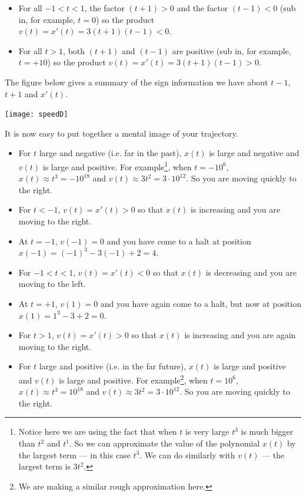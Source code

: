 \begin{eg}
\begin{itemize}
\item For all $-1<t<1$, the factor $(t+1)>0$ and the factor $(t-1)<0$
(sub in, for example, $t=0$) so the product $v(t)=x'(t)=3(t+1)(t-1)<0$.

\item For all $t>1$, both $(t+1)$ and $(t-1)$ are positive (sub in, for example,
$t=+10$) so the product $v(t)=x'(t)=3(t+1)(t-1)>0$.
\end{itemize}
The figure below gives a summary of the sign information we have about
$t-1$, $t+1$ and $x'(t)$.
\begin{efig}
\begin{center}
   \texttt{[image: speedD]}
\end{center}
\end{efig}
It is now easy to put together a mental image of your trajectory.
\begin{itemize}
\item For $t$ large and negative (i.e. far in the past), $x(t)$ is large
and negative and $v(t)$ is large and positive. For example\footnote{Notice here we are
using the fact that when $t$ is very large $t^3$ is much bigger than $t^2$ and $t^1$.
So we can approximate the value of the polynomial $x(t)$ by the largest term --- in
this case $t^3$. We can do similarly with $v(t)$ --- the largest term is $3t^2$.}, when
$t=-10^6$, $x(t)\approx t^3=- 10^{18}$ and $v(t)\approx  3t^2 = 3\cdot 10^{12}$.
So you are moving quickly to the right.

\item For $t<-1$, $v(t)=x'(t)>0$ so that $x(t)$ is increasing and you are moving
to the right.

\item At $t=-1$, $v(-1)=0$ and you have come to a halt at
position $x(-1)=(-1)^3-3(-1)+2=4$.

\item For $-1<t<1$, $v(t)=x'(t)<0$ so that $x(t)$ is decreasing and you are moving
to the left.

\item At $t=+1$, $v(1)=0$ and you have again come to a halt, but now at
position $x(1)=1^3-3+2=0$.

\item For $t>1$, $v(t)=x'(t)>0$ so that $x(t)$ is increasing and you are
again moving to the right.

\item For $t$ large and positive (i.e. in the far future), $x(t)$ is large
and positive and $v(t)$ is large and positive. For example\footnote{We are making a
similar rough approximation here.}, when $t=10^6$, $x(t)\approx t^3= 10^{18}$ and
$v(t)\approx  3t^2 = 3\cdot 10^{12}$. So you are moving quickly to the right.


\end{itemize}
\end{eg}
